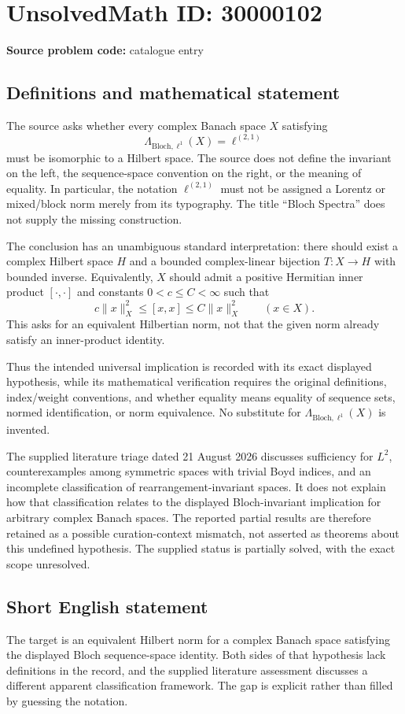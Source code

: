 \documentclass[11pt]{article}
\begin{document}
\section*{UnsolvedMath ID: 30000102}
\textbf{Source problem code:} catalogue entry
\subsection{Definitions and mathematical statement}
The source asks whether every complex Banach space \(X\) satisfying
\[
 \Lambda_{\mathrm{Bloch},\ell^1}(X)=\ell^{(2,1)}
\]
must be isomorphic to a Hilbert space. The source does not define the invariant on the left, the sequence-space convention on the right, or the meaning of equality. In particular, the notation \(\ell^{(2,1)}\) must not be assigned a Lorentz or mixed/block norm merely from its typography. The title ``Bloch Spectra'' does not supply the missing construction.

The conclusion has an unambiguous standard interpretation: there should exist a complex Hilbert space \(H\) and a bounded complex-linear bijection \(T:X\to H\) with bounded inverse. Equivalently, \(X\) should admit a positive Hermitian inner product \([\cdot,\cdot]\) and constants \(0<c\leq C<\infty\) such that
\[
 c\|x\|_X^2\leq[x,x]\leq C\|x\|_X^2\qquad(x\in X).
\]
This asks for an equivalent Hilbertian norm, not that the given norm already satisfy an inner-product identity.

Thus the intended universal implication is recorded with its exact displayed hypothesis, while its mathematical verification requires the original definitions, index/weight conventions, and whether equality means equality of sequence sets, normed identification, or norm equivalence. No substitute for \(\Lambda_{\mathrm{Bloch},\ell^1}(X)\) is invented.

The supplied literature triage dated 21 August 2026 discusses sufficiency for \(L^2\), counterexamples among symmetric spaces with trivial Boyd indices, and an incomplete classification of rearrangement-invariant spaces. It does not explain how that classification relates to the displayed Bloch-invariant implication for arbitrary complex Banach spaces. The reported partial results are therefore retained as a possible curation-context mismatch, not asserted as theorems about this undefined hypothesis. The supplied status is partially solved, with the exact scope unresolved.
\subsection{Short English statement}
The target is an equivalent Hilbert norm for a complex Banach space satisfying the displayed Bloch sequence-space identity. Both sides of that hypothesis lack definitions in the record, and the supplied literature assessment discusses a different apparent classification framework. The gap is explicit rather than filled by guessing the notation.
\end{document}
